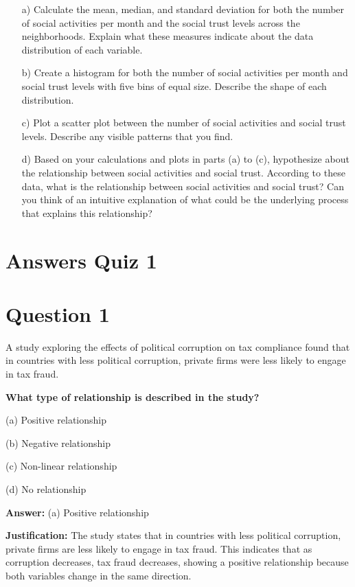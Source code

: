 \documentclass{article}
\begin{document}
\begin{enumerate}
    \item[a)] Calculate the mean, median, and standard deviation for both the number of social activities per month and the social trust levels across the neighborhoods. Explain what these measures indicate about the data distribution of each variable.
    \item[b)] Create a histogram for both the number of social activities per month and social trust levels with five bins of equal size. Describe the shape of each distribution.
    \item[c)] Plot a scatter plot between the number of social activities and social trust levels. Describe any visible patterns that you find.
    \item[d)] Based on your calculations and plots in parts (a) to (c), hypothesize about the relationship between social activities and social trust. According to these data, what is the relationship between social activities and social trust? Can you think of an intuitive explanation of what could be the underlying process that explains this relationship?
\end{enumerate}

\newpage

\section*{Answers Quiz 1}

\section*{Question 1}
A study exploring the effects of political corruption on tax compliance found that in countries with less
political corruption, private firms were less likely to engage in tax fraud.

\textbf{What type of relationship is described in the study?}

(a) Positive relationship

(b) Negative relationship

(c) Non-linear relationship

(d) No relationship

\textbf{Answer:} (a) Positive relationship

\textbf{Justification:} The study states that in countries with less political corruption, private firms are less likely to engage in tax fraud. This indicates that as corruption decreases, tax fraud decreases, showing a positive relationship because both variables change in the same direction.
\end{document}
